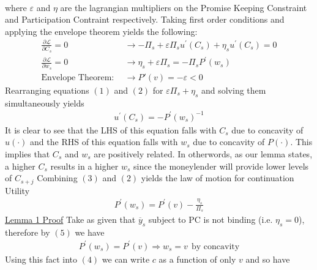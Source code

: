 \documentclass{article}
\begin{document}
\begin{itemize}
\begin{itemize}
\begin{itemize}
\begin{gather*}
            \end{gather*}
            where $\varepsilon$ and $\eta$ are the lagrangian multipliers on the Promise Keeping Constraint and Participation Contraint respectively. Taking first order conditions and applying the envelope theorem yields the following:
            \begin{align*}
                \frac{\partial \mathcal{L}}{\partial C_{s}} = 0 &\rightarrow -\Pi_{s} + \varepsilon \Pi_{s} u^{'}(C_{s}) + \eta_{s} u^{'} (C_{s}) = 0 \tag{1} \\
                \frac{\partial \mathcal{L}}{\partial w_{s}} = 0 &\rightarrow \eta_{s} + \varepsilon \Pi_{s} = - \Pi_{s}P^{'}(w_{s}) \tag{2} \\
                \text{Envelope Theorem}: \ \ &\rightarrow P'(v) = - \varepsilon < 0 \tag{3}
            \end{align*}
            Rearranging equations $(1)$ and $(2)$ for $\varepsilon \Pi_{s} + \eta_{s}$ and solving them simultaneously yields
            \begin{align*}
                u^{'}(C_{s}) = - P^{'}(w_{s})^{-1} \tag{4}
            \end{align*}
            It is clear to see that the LHS of this equation falls with $C_{s}$ due to concavity of $u(\cdot)$ and the RHS of this equation falls with $w_{s}$ due to concavity of $P(\cdot)$. This implies that $C_{s}$ and $w_{s}$ are positively related. In otherwords, as our lemma states, a higher $C_{s}$ results in a higher $w_{s}$ since the moneylender will provide lower levels of $C_{s+j}$
            \newline
            Combining $(3)$ and $(2)$ yields the law of motion for continuation Utility
            \begin{align*}
                P^{'}(w_{s}) = P^{'}(v) - \frac{\eta_{s}}{\Pi_{s}} \tag{5}
            \end{align*}
            \newline
            \underline{Lemma 1 Proof}
            \newline
            Take as given that $\overline{y}_{s}$ subject to PC is not binding (i.e. $\eta_{s} = 0$), therefore by $(5)$ we have
            \begin{gather*}
                P^{'}(w_{s}) = P^{'}(v) \Rightarrow w_{s} = v \ \ \text{by concavity}
            \end{gather*}
            Using this fact into $(4)$ we can write $c$ as a function of only $v$ and so have
            \begin{gather*}

\end{gather*}
\end{itemize}
\end{itemize}
\end{itemize}
\end{document}
